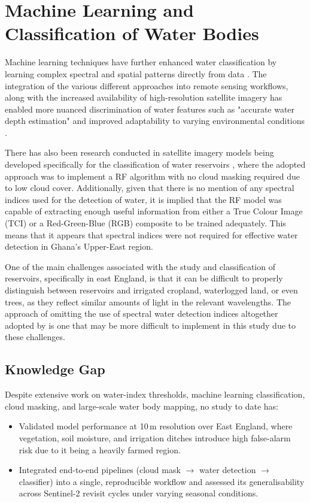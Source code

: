 \section{Machine Learning and Classification of Water Bodies}
Machine learning techniques have further enhanced water classification by learning complex spectral and spatial patterns directly from data \citep{ibm_2021b}. The integration of the various different approaches into remote sensing workflows, along with the increased availability of high-resolution satellite imagery has enabled more nuanced discrimination of water features such as "accurate water depth estimation" \citep{liu_wu_wu_zhou_2024} and improved adaptability to varying environmental conditions \citep{rahat_steissberg_etal_2023}.

There has also been research conducted in satellite imagery models being developed specifically for the classification of water reservoirs \citep{ghansah_2022_monitoring}, where the adopted approach was to implement a RF algorithm with no cloud masking required due to low cloud cover. Additionally, given that there is no mention of any spectral indices used for the detection of water, it is implied that the RF model was capable of extracting enough useful information from either a True Colour Image (TCI) or a Red-Green-Blue (RGB) composite to be trained adequately. This means that it appears that spectral indices were not required for effective water detection in Ghana's Upper-East region.

One of the main challenges associated with the study and classification of reservoirs, specifically in east England, is that it can be difficult to properly distinguish between reservoirs and irrigated cropland, waterlogged land, or even trees, as they reflect similar amounts of light in the relevant wavelengths. The approach of omitting the use of spectral water detection indices altogether adopted by \cite{ghansah_2022_monitoring} is one that may be more difficult to implement in this study due to these challenges. 

\subsection{Knowledge Gap}
Despite extensive work on water-index thresholds, machine learning classification, cloud masking, and large-scale water body mapping, no study to date has:
\begin{itemize}
    \item Validated model performance at 10\,m resolution over East England, where vegetation, soil moisture, and irrigation ditches introduce high false-alarm risk due to it being a heavily farmed region.
    \item Integrated end-to-end pipelines (cloud mask $\rightarrow$ water detection $\rightarrow$ classifier) into a single, reproducible workflow and assessed its generalisability across Sentinel-2 revisit cycles under varying seasonal conditions.
\end{itemize}

